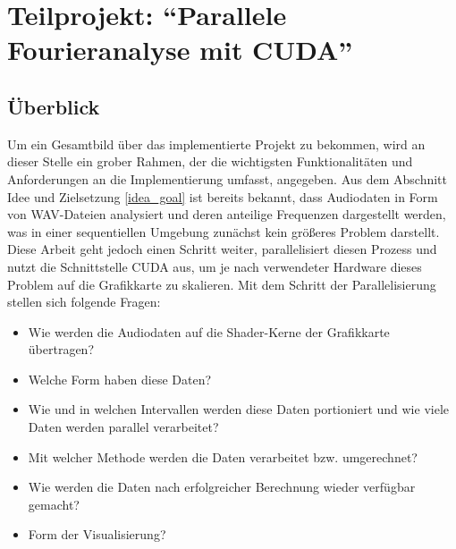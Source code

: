 
\section[Teilprojekt: \enquote{Parallele Fourieranalyse mit CUDA}]{Teilprojekt: \enquote{Parallele Fourieranalyse mit CUDA}} \label{CUDA_DSP}

\subsection{Überblick}
Um ein Gesamtbild über das implementierte Projekt zu bekommen, wird an dieser Stelle ein grober Rahmen, der die wichtigsten Funktionalitäten und Anforderungen an die Implementierung umfasst, angegeben.
Aus dem Abschnitt Idee und Zielsetzung \ref{idea_goal} ist bereits bekannt, dass Audiodaten in Form von WAV-Dateien analysiert und deren anteilige Frequenzen dargestellt werden, was in einer sequentiellen Umgebung zunächst kein größeres Problem darstellt.
Diese Arbeit geht jedoch einen Schritt weiter, parallelisiert diesen Prozess und nutzt die Schnittstelle CUDA aus, um je nach verwendeter Hardware dieses Problem auf die Grafikkarte zu skalieren. 
Mit dem Schritt der Parallelisierung stellen sich folgende Fragen:

\begin{itemize}
	\item Wie werden die Audiodaten auf die Shader-Kerne der Grafikkarte übertragen?
	\item Welche Form haben diese Daten?
	\item Wie und in welchen Intervallen werden diese Daten portioniert und wie viele Daten werden parallel verarbeitet?
	\item Mit welcher Methode werden die Daten verarbeitet bzw. umgerechnet?
	\item Wie werden die Daten nach erfolgreicher Berechnung wieder verfügbar gemacht?
	\item Form der Visualisierung?
\end{itemize}

